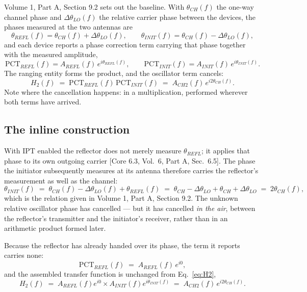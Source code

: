 \documentclass[11pt,a4paper]{article}
\newcommand{\PCT}{\ensuremath{\mathrm{PCT}}}
\newcommand{\IPT}{\ensuremath{\mathrm{IPT}}}
\newcommand{\core}[1]{\textcolor{rulegrey}{\small[Core 6.3, #1]}}
\begin{document}
Volume 1, Part A, Section 9.2 sets out the baseline. With $\theta_{CH}(f)$ the one-way channel phase
and $\Delta\theta_{LO}(f)$ the relative carrier phase between the devices, the phases measured at the
two antennas are
\begin{equation}
\theta_{REFL}(f) = \theta_{CH}(f) + \Delta\theta_{LO}(f),
\qquad
\theta_{INIT}(f) = \theta_{CH}(f) - \Delta\theta_{LO}(f),
\label{eq:baseline}
\end{equation}
and each device reports a phase correction term carrying that phase together with the measured
amplitude,
\begin{equation}
\PCT_{REFL}(f) = A_{REFL}(f)\,e^{i\theta_{REFL}(f)},
\qquad
\PCT_{INIT}(f) = A_{INIT}(f)\,e^{i\theta_{INIT}(f)} .
\label{eq:pcts}
\end{equation}
The ranging entity forms the product, and the oscillator term cancels:
\begin{equation}
H_2(f) \;=\; \PCT_{REFL}(f)\,\PCT_{INIT}(f) \;=\; A_{CH2}(f)\,e^{i2\theta_{CH}(f)} .
\label{eq:H2}
\end{equation}
Note where the cancellation happens: in a multiplication, performed wherever both terms have arrived.

\subsection{The inline construction}

With \IPT{} enabled the reflector does not merely measure $\theta_{REFL}$; it applies that phase to
its own outgoing carrier \core{Vol.\ 6, Part A, Sec.\ 6.5}. The phase the initiator subsequently
measures at its antenna therefore carries the reflector's measurement as well as the channel:
\begin{equation}
\theta_{INIT}(f)
 \;=\; \theta_{CH}(f) - \Delta\theta_{LO}(f) + \theta_{REFL}(f)
 \;=\; \theta_{CH} - \Delta\theta_{LO} + \theta_{CH} + \Delta\theta_{LO}
 \;=\; 2\theta_{CH}(f) ,
\label{eq:inline}
\end{equation}
which is the relation given in Volume 1, Part A, Section 9.2. The unknown relative oscillator phase
has cancelled --- but it has cancelled \emph{in the air}, between the reflector's transmitter and the
initiator's receiver, rather than in an arithmetic product formed later.

Because the reflector has already handed over its phase, the term it reports carries none:
\begin{equation}
\PCT_{REFL}(f) \;=\; A_{REFL}(f)\,e^{i0} ,
\label{eq:pctrefl}
\end{equation}
and the assembled transfer function is unchanged from Eq.~\eqref{eq:H2},
\begin{equation}
H_2(f) \;=\; A_{REFL}(f)e^{i0} \times A_{INIT}(f)e^{i\theta_{INIT}(f)}
 \;=\; A_{CH2}(f)\,e^{i2\theta_{CH}(f)} .
\label{eq:H2ipt}
\end{equation}
\end{document}

